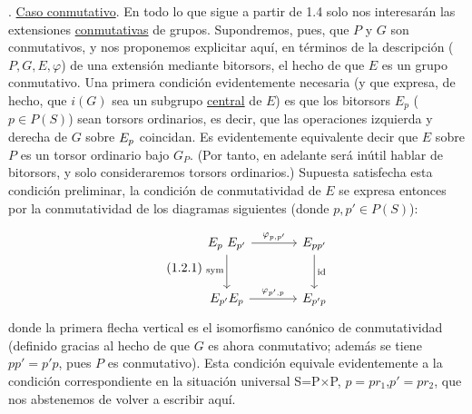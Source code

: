 \par\medskip{}. \underline{Caso conmutativo}. En todo lo que sigue a partir de
1.4 solo nos interesarán las extensiones \underline{conmutativas} de
grupos. Supondremos, pues, que $P$ y $G$ son conmutativos, y nos
proponemos explicitar aquí, en términos
de la descripción ($P,G,E,\varphi$) de una extensión mediante
bitorsors, el hecho de que $E$ es un grupo conmutativo. Una primera
condición evidentemente necesaria (y que expresa, de hecho, que $i(G)$
sea un subgrupo \underline{central} de $E$) es que los bitorsors $E_p$
($p \in P(S)$) sean torsors ordinarios, es decir, que las operaciones
izquierda y derecha de $G$ sobre $\sisi{P_p}{E_p}$ coincidan. Es
evidentemente equivalente decir que $E$ sobre $P$ es un torsor ordinario
bajo $G_P$. (Por tanto, en adelante será inútil hablar de bitorsors, y
solo consideraremos torsors ordinarios.) Supuesta satisfecha esta
condición preliminar, la condición de conmutatividad de $E$ se expresa
entonces por la conmutatividad de los diagramas siguientes (donde
$p,p' \in P(S)$):

\begin{equation}\tag{1.2.1}
\begin{tikzcd}[column sep=large, row sep=large]
E_p\ E_{p'} \arrow[r, "{\varphi_{p,p'}}"] \arrow[d, "\mathrm{sym}"'] & E_{pp'} \arrow[d, "\mathrm{id}"] \\
E_{p'}E_p \arrow[r, "{\varphi_{p',p}}"] & E_{p'p}
\end{tikzcd}
\end{equation}
donde la primera flecha vertical es el isomorfismo canónico de
conmutatividad (definido gracias al hecho de que $G$ es ahora
conmutativo; además se tiene $pp' = p'p$, pues $P$ es conmutativo).
Esta condición equivale evidentemente a la condición correspondiente
en la situación universal S=P$\times$P, $p=pr_1$,$p' = pr_2$, que nos
abstenemos de volver a escribir aquí.
